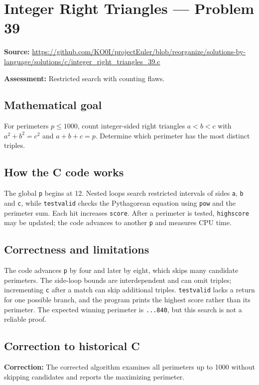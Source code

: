 \section{Integer Right Triangles --- Problem 39}
\label{prob:39}
\noindent\textbf{Source:} \url{https://github.com/KO0I/projectEuler/blob/reorganize/solutions-by-language/solutions/c/integer_right_triangles_39.c}

\noindent\textbf{Assessment:} Restricted search with counting flaws.

\subsection*{Mathematical goal}
For perimeters \(p\leq1000\), count integer-sided right triangles \(a<b<c\) with \(a^2+b^2=c^2\) and \(a+b+c=p\). Determine which perimeter has the most distinct triples.

\subsection*{How the C code works}
The global \verb|p| begins at 12. Nested loops search restricted intervals of sides \verb|a|, \verb|b| and \verb|c|, while \verb|testvalid| checks the Pythagorean equation using \verb|pow| and the perimeter sum. Each hit increases \verb|score|. After a perimeter is tested, \verb|highscore| may be updated; the code advances to another \verb|p| and measures CPU time.

\subsection*{Correctness and limitations}
The code advances \verb|p| by four and later by eight, which skips many candidate perimeters. The side-loop bounds are interdependent and can omit triples; incrementing \verb|c| after a match can skip additional triples. \verb|testvalid| lacks a return for one possible branch, and the program prints the highest score rather than its perimeter. The expected winning perimeter is \texttt{...840}, but this search is not a reliable proof.


\subsection*{Correction to historical C}
{\color{red}\textbf{Correction:} The corrected algorithm examines all perimeters up to 1000 without skipping candidates and reports the maximizing perimeter.}
